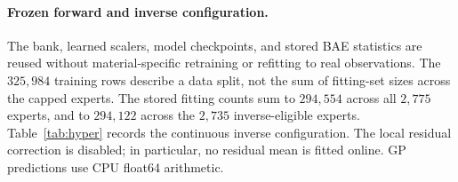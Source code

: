 \paragraph{Frozen forward and inverse configuration.}
The bank, learned scalers, model checkpoints, and stored BAE statistics
are reused without material-specific retraining or refitting to real
observations. The $325{,}984$ training rows describe a data split,
not the sum of fitting-set sizes across the capped experts. The
stored fitting counts sum to $294{,}554$ across all $2{,}775$ experts,
and to $294{,}122$ across the $2{,}735$ inverse-eligible experts.
Table~\ref{tab:hyper} records the continuous inverse configuration.
The local residual correction is disabled; in particular, no residual
mean is fitted online. GP predictions use CPU float64 arithmetic.

